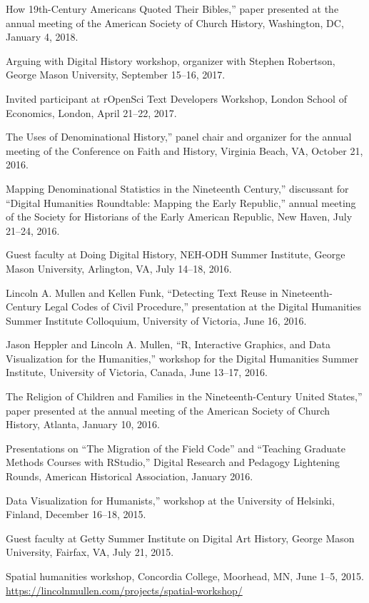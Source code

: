 \documentclass[11pt]{article}
\begin{document}
\noindent{}How 19th-Century Americans Quoted Their Bibles,'' paper presented at the annual meeting of the American Society of Church History, Washington, DC, January 4, 2018.

Arguing with Digital History workshop, organizer with Stephen Robertson, George Mason University, September 15--16, 2017.

Invited participant at rOpenSci Text Developers Workshop, London School of Economics, London, April 21--22, 2017.

\noindent{}The Uses of Denominational History,'' panel chair and organizer for the annual meeting of the Conference on Faith and History, Virginia Beach, VA, October 21, 2016.

\noindent{}Mapping Denominational Statistics in the Nineteenth Century,'' discussant for ``Digital Humanities Roundtable: Mapping the Early Republic,'' annual meeting of the Society for Historians of the Early American Republic, New Haven, July 21--24, 2016.

Guest faculty at Doing Digital History, NEH-ODH Summer Institute, George Mason University, Arlington, VA, July 14--18, 2016.

Lincoln A. Mullen and Kellen Funk, ``Detecting Text Reuse in Nineteenth-Century Legal Codes of Civil Procedure,'' presentation at the Digital Humanities Summer Institute Colloquium, University of Victoria, June 16, 2016.

Jason Heppler and Lincoln A. Mullen, ``R, Interactive Graphics, and Data Visualization for the Humanities,'' workshop for the Digital Humanities Summer Institute, University of Victoria, Canada, June 13--17, 2016.  

\noindent{}The Religion of Children and Families in the Nineteenth-Century United States,'' paper presented at the annual meeting of the American Society of Church History, Atlanta, January 10, 2016.

Presentations on ``The Migration of the Field Code'' and ``Teaching Graduate Methods Courses with RStudio,'' Digital Research and Pedagogy Lightening Rounds, American Historical Association, January 2016.

\noindent{}Data Visualization for Humanists,'' workshop at the University of Helsinki, Finland, December 16--18, 2015. 

Guest faculty at Getty Summer Institute on Digital Art History, George Mason University, Fairfax, VA, July 21, 2015.

Spatial humanities workshop, Concordia College, Moorhead, MN, June 1--5, 2015. \url{https://lincolnmullen.com/projects/spatial-workshop/}
\end{document}

